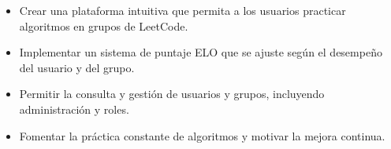 \begin{itemize}
    \item Crear una plataforma intuitiva que permita a los usuarios practicar algoritmos en grupos de LeetCode.
    \item Implementar un sistema de puntaje ELO que se ajuste según el desempeño del usuario y del grupo.
    \item Permitir la consulta y gestión de usuarios y grupos, incluyendo administración y roles.
    \item Fomentar la práctica constante de algoritmos y motivar la mejora continua.
\end{itemize}
